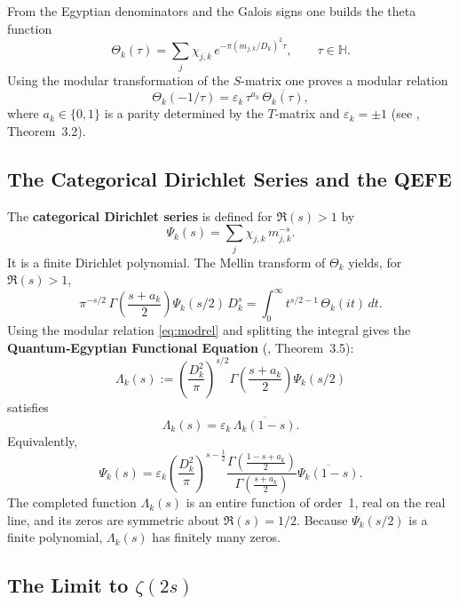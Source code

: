 \documentclass[11pt,a4paper]{article}
\theoremstyle{remark}
\begin{document}
From the Egyptian denominators and the Galois signs one builds the theta function
\begin{equation}\label{eq:theta}
\Theta_k(\tau) = \sum_{j} \chi_{j,k}\, e^{-\pi (m_{j,k}/D_k)^2 \tau}, \qquad \tau\in\mathbb{H}.
\end{equation}
Using the modular transformation of the \(S\)-matrix one proves a modular relation
\begin{equation}\label{eq:modrel}
\Theta_k(-1/\tau) = \varepsilon_k\, \tau^{a_k}\, \overline{\Theta_k(\tau)},
\end{equation}
where \(a_k\in\{0,1\}\) is a parity determined by the \(T\)-matrix and \(\varepsilon_k=\pm1\) (see \cite{qefe}, Theorem~3.2).

\subsection{The Categorical Dirichlet Series and the QEFE}

The \textbf{categorical Dirichlet series} is defined for \(\Re(s)>1\) by
\begin{equation}\label{eq:Psi}
\Psi_k(s) = \sum_{j} \chi_{j,k}\, m_{j,k}^{-s}.
\end{equation}
It is a finite Dirichlet polynomial.
The Mellin transform of \(\Theta_k\) yields, for \(\Re(s)>1\),
\[
\pi^{-s/2}\,\Gamma\!\left(\frac{s+a_k}{2}\right) \Psi_k(s/2)\, D_k^{s}
= \int_0^\infty t^{s/2-1}\,\Theta_k(it)\,dt.
\]
Using the modular relation \eqref{eq:modrel} and splitting the integral gives the \textbf{Quantum‑Egyptian Functional Equation} (\cite{qefe}, Theorem~3.5):
\begin{equation}\label{eq:QEFE}
\Lambda_k(s) := \left(\frac{D_k^2}{\pi}\right)^{\!s/2} \Gamma\!\left(\frac{s+a_k}{2}\right) \Psi_k(s/2)
\end{equation}
satisfies
\begin{equation}\label{eq:functional}
\Lambda_k(s) = \varepsilon_k\,\overline{\Lambda_k(1-s)}.
\end{equation}
Equivalently,
\[
\Psi_k(s) = \varepsilon_k \left(\frac{D_k^2}{\pi}\right)^{\!s-\frac12}
\frac{\Gamma\!\left(\frac{1-s+a_k}{2}\right)}{\Gamma\!\left(\frac{s+a_k}{2}\right)}
\overline{\Psi_k(1-s)}.
\]
The completed function \(\Lambda_k(s)\) is an entire function of order~1, real on the real line, and its zeros are symmetric about \(\Re(s)=1/2\).
Because \(\Psi_k(s/2)\) is a finite polynomial, \(\Lambda_k(s)\) has finitely many zeros.

\subsection{The Limit to \(\zeta(2s)\)}
\end{document}
